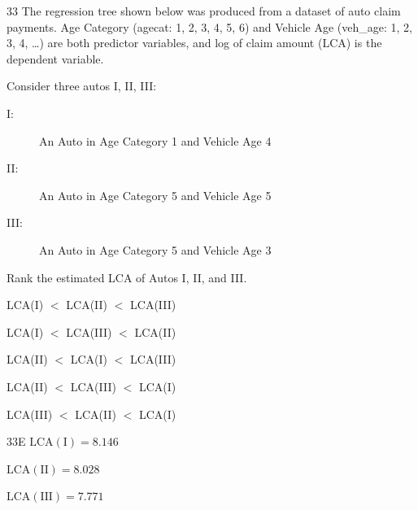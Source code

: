 \begin{question}{33}
The regression tree shown below was produced from a dataset of auto claim payments. Age Category (agecat: 1, 2, 3, 4, 5, 6) and Vehicle Age (veh\_age: 1, 2, 3, 4, \ldots) are both predictor variables, and log of claim amount (LCA) is the dependent variable.


Consider three autos I, II, III:
\begin{description}
\item[I:] An Auto in Age Category 1 and Vehicle Age 4
\item[II:] An Auto in Age Category 5 and Vehicle Age 5
\item[III:] An Auto in Age Category 5 and Vehicle Age 3
\end{description}

Rank the estimated LCA of Autos I, II, and III.

\begin{choices}
\item LCA(I) $<$ LCA(II) $<$ LCA(III)
\item LCA(I) $<$ LCA(III) $<$ LCA(II)
\item LCA(II) $<$ LCA(I) $<$ LCA(III)
\item LCA(II) $<$ LCA(III) $<$ LCA(I)
\item LCA(III) $<$ LCA(II) $<$ LCA(I)
\end{choices}
\end{question}
\begin{solution}{33}{E}
$\mathrm{LCA(I)} = 8.146$

$\mathrm{LCA(II)} = 8.028$

$\mathrm{LCA(III)} = 7.771$
\end{solution}

